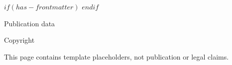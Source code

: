 $if(has-frontmatter)$
\frontmatter
$endif$

\thispagestyle{empty}
\begingroup
\raggedright
\vspace*{0.16\textheight}
{\alkahestdisplayfont\fontsize{38}{43}\selectfont\alkahestbooktitle\par}
\vspace{1.5\baselineskip}
{\sffamily\Large\alkahestbooksubtitle\par}
\vfill
{\sffamily\large\alkahestbookauthor\par}
\vspace{0.75\baselineskip}
{\sffamily\small\alkahestedition\par}
\vspace{2\baselineskip}
{\sffamily\small\alkahestpublisher\par}
\endgroup
\clearpage

\thispagestyle{empty}
\begingroup
\small
\vspace*{\fill}
{\alkahestdisplayfont\Large Publication data\par}
\vspace{1.5\baselineskip}
Copyright \textcopyright\ \alkahestcopyrightyear\ \alkahestcopyrightholder\par
\alkahestrightsstatement\par
\vspace{\baselineskip}
\alkahestedition\par
\alkahestpublisher\par
\alkahestidentifier\par
\vspace{\baselineskip}
This page contains template placeholders, not publication or legal claims.\par
\endgroup
\clearpage

\thispagestyle{empty}
\begingroup
\vspace*{\fill}
\begin{center}
{\alkahestdisplayfont\Large\alkahestdedication\par}
\end{center}
\vspace*{\fill}
\endgroup
\cleardoublepage
